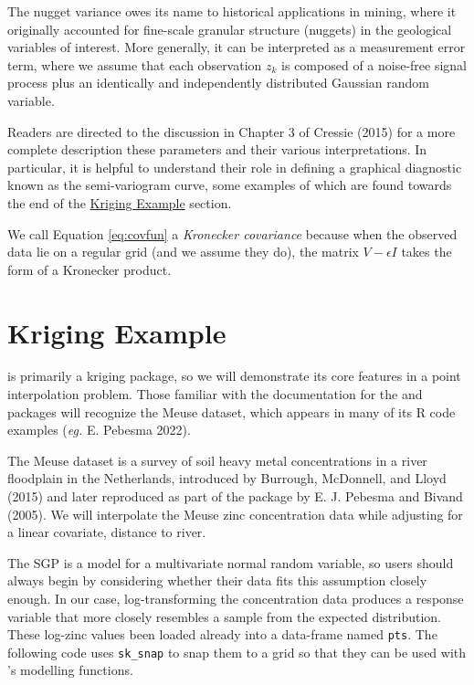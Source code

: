 The nugget variance owes its name to historical applications in mining, where it originally accounted for fine-scale granular structure (nuggets) in the geological variables of interest. More generally, it can be interpreted as a measurement error term, where we assume that each observation \(z_k\) is composed of a noise-free signal process plus an identically and independently distributed Gaussian random variable.

Readers are directed to the discussion in Chapter 3 of Cressie (2015) for a more complete description these parameters and their various interpretations. In particular, it is helpful to understand their role in defining a graphical diagnostic known as the semi-variogram curve, some examples of which are found towards the end of the \protect\hyperlink{kriging-example}{Kriging Example} section.

We call Equation \eqref{eq:covfun} a \emph{Kronecker covariance} because when the observed data lie on a regular grid (and we assume they do), the matrix \(V - \epsilon I\) takes the form of a Kronecker product.

\hypertarget{kriging-example}{%
\section{Kriging Example}\label{kriging-example}}

 is primarily a kriging package, so we will demonstrate its core features in a point interpolation problem. Those familiar with the documentation for the  and  packages will recognize the Meuse dataset, which appears in many of its R code examples (\emph{eg.} E. Pebesma 2022).

The Meuse dataset is a survey of soil heavy metal concentrations in a river floodplain in the Netherlands, introduced by Burrough, McDonnell, and Lloyd (2015) and later reproduced as part of the  package by E. J. Pebesma and Bivand (2005). We will interpolate the Meuse zinc concentration data while adjusting for a linear covariate, distance to river.

The SGP is a model for a multivariate normal random variable, so users should always begin by considering whether their data fits this assumption closely enough. In our case, log-transforming the concentration data produces a response variable that more closely resembles a sample from the expected distribution. These log-zinc values been loaded already into a data-frame named \texttt{pts}. The following code uses \texttt{sk\_snap} to snap them to a grid so that they can be used with 's modelling functions.

